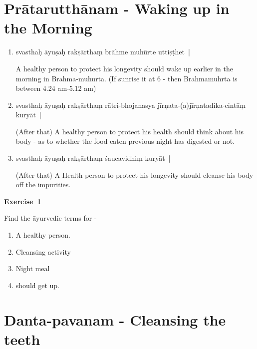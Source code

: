 \chapter{Prātarutthānam - Waking up in the Morning}

\begin{enumerate}
\itemsep=0pt
\item {}

svasthaḥ āyuṣaḥ rakṣārthaṃ brāhme muhūrte uttiṣṭhet~|

A healthy person to protect his longevity should wake up earlier in the morning in Brahma-muhurta. (If sunrise it at 6 - then Brahmamuhrta is between 4.24 am-5.12 am) 

\item {}

svasthaḥ āyuṣaḥ rakṣārthaṃ  rātri-bhojanasya jīrṇata-(a)jīrṇatadika-cintāṃ kuryāt~| 

(After that) A healthy person to protect his health should think about his body - as to whether the food eaten previous night has digested or not. 

\item {}

svasthaḥ āyuṣaḥ rakṣārthaṃ   śaucavidhiṃ kuryāt~| 

(After that) A Health person to protect his longevity should cleanse his body off the impurities.
\end{enumerate}

\centerline{\textbf{Exercise~1}}

Find the āyurvedic terms for - 
\begin{enumerate}
\itemsep=0pt
\renewcommand{\theenumi}{\alph{enumi}}
\renewcommand{\labelenumi}{\theenumi.}
\item A healthy person.
\item Cleansing activity
\item Night meal 
\item should get up.
\end{enumerate}

\chapter{Danta-pavanam - Cleansing the teeth}

